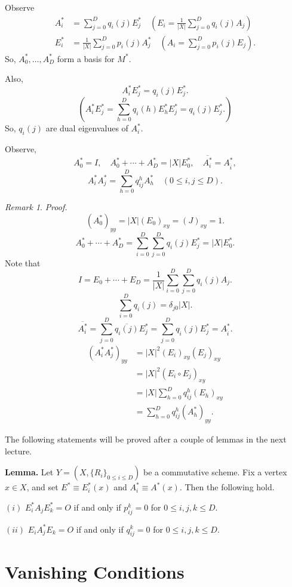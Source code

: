 \documentclass[
]{book}
\theoremstyle{definition}
\theoremstyle{definition}
\theoremstyle{definition}
\theoremstyle{definition}
\theoremstyle{remark}
\newtheorem*{remark}{Remark}
\begin{document}
Observe
\begin{align}
A^*_i & = \sum_{j=0}^Dq_i(j)E^*_j \quad \left(E_i = \frac{1}{|X|}\sum_{j=0}^D q_i(j)A_j\right)\\
E^*_i & = \frac{1}{|X|}\sum_{j=0}^D p_i(j)A^*_j \quad \left(A_i = \sum_{j=0}^D p_i(j)E_j\right).
\end{align}
So, \(A^*_0, \ldots, A^*_D\) form a basis for \(M^*\).

Also,
\[A^*_iE^*_j = q_i(j)E^*_j.\]
\[\left(A^*_iE^*_j = \sum_{h=0}^D q_i(h)E^*_hE^*_j = q_i(j)E^*_j.\right)\]
So, \(q_i(j)\) are dual eigenvalues of \(A^*_i\).

Observe,
\[A^*_0 = I, \quad A^*_0 + \cdots + A^*_D = |X|E^*_0, \quad \overline{A^*_i} = A^*_{\hat{i}},\]
\[A^*_iA^*_j = \sum_{h=0}^D q^h_{ij}A^*_h \quad (0\leq i,j\leq D).\]

\begin{remark}
\emph{Proof.}
\[(A^*_0)_{yy} = |X|(E_0)_{xy} = (J)_{xy} = 1.\]
\[A^*_0 + \cdots + A^*_D = \sum_{i=0}^D\sum_{j=0}^D q_i(j)E^*_j = |X|E^*_0.\]
Note that
\[I = E_0 + \cdots + E_D = \frac{1}{|X|}\sum_{i=0}^D\sum_{j=0}^D q_i(j)A_j.\]
\[\sum_{i=0}^D q_i(j) = \delta_{j0}|X|.\]
\[\overline{A^*_i} = \sum_{j=0}^D\overline{q_i(j)}E^*_j = \sum_{j=0}^D q_{\hat{i}}(j)E^*_j = A^*_{\hat{i}}.\]
\begin{align}
(A^*_iA^*_j)_{yy} & = |X|^2 (E_i)_{xy}(E_j)_{xy}\\
& = |X|^2(E_i\circ E_j)_{xy}\\
& = |X|\sum_{h=0}^D q^h_{ij}(E_h)_{xy}\\
& = \sum_{h=0}^D q^h_{ij}(A^*_h)_{yy}.
\end{align}
\end{remark}

The following statements will be proved after a couple of lemmas in the next lecture.

\textbf{Lemma.}
Let \(Y = (X, \{R_i\}_{0\leq i\leq D})\) be a commutative scheme. Fix a vertex \(x\in X\), and set \(E^*\equiv E^*_i(x)\) and \(A^*_i \equiv A^*(x)\).
Then the following hold.

\((i)\) \(E^*_iA_jE^*_k = O\) if and only if \(p^k_{ij} = 0\) for \(0\leq i,j,k\leq D\).

\((ii)\) \(E_iA^*_jE_k = O\) if and only if \(q^k_{ij} = 0\) for \(0\leq i,j,k\leq D\).

\hypertarget{lec20}{%
\chapter{Vanishing Conditions}\label{lec20}}
\end{document}
